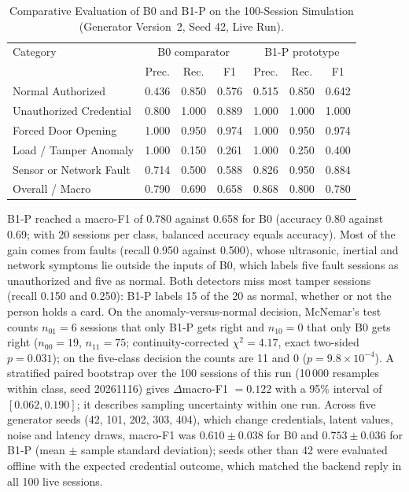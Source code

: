 \documentclass[journal,onecolumn]{IEEEtran}
\begin{document}
\begin{table}[!htbp]
\renewcommand{\arraystretch}{1.02}
\centering
\small
\caption{Comparative Evaluation of B0 and B1-P on the 100-Session Simulation (Generator Version~2, Seed 42, Live Run).}
\label{tab:b0_vs_b1}
\vspace{2pt}
\begin{tabular}{l ccc ccc}
\hline
Category & \multicolumn{3}{c}{B0 comparator} & \multicolumn{3}{c}{B1-P prototype} \\
 & Prec. & Rec. & F1 & Prec. & Rec. & F1 \\
\hline
\rule{0pt}{2.6ex}Normal Authorized & 0.436 & 0.850 & 0.576 & 0.515 & 0.850 & 0.642 \\
Unauthorized Credential & 0.800 & 1.000 & 0.889 & 1.000 & 1.000 & 1.000 \\
Forced Door Opening & 1.000 & 0.950 & 0.974 & 1.000 & 0.950 & 0.974 \\
Load / Tamper Anomaly & 1.000 & 0.150 & 0.261 & 1.000 & 0.250 & 0.400 \\
Sensor or Network Fault & 0.714 & 0.500 & 0.588 & 0.826 & 0.950 & 0.884 \\
\hline
\rule{0pt}{2.6ex}Overall / Macro & 0.790 & 0.690 & 0.658 & 0.868 & 0.800 & 0.780 \\
\hline
\end{tabular}
\end{table}

B1-P reached a macro-F1 of 0.780 against 0.658 for B0 (accuracy 0.80 against 0.69; with 20 sessions per class,
balanced accuracy equals accuracy). Most of the gain comes from faults (recall 0.950 against 0.500), whose ultrasonic,
inertial and network symptoms lie outside the inputs of B0, which labels five fault sessions as unauthorized and five
as normal. Both detectors miss most tamper sessions (recall 0.150 and 0.250): B1-P labels 15 of the 20
as normal, whether or not the person holds a card. On the anomaly-versus-normal decision, McNemar's test counts
$n_{01}=6$ sessions that only B1-P gets right and $n_{10}=0$ that only B0 gets right ($n_{00}=19$, $n_{11}=75$;
continuity-corrected $\chi^2=4.17$, exact two-sided $p=0.031$); on the five-class decision the counts are 11 and 0
($p=9.8\times10^{-4}$). A stratified paired bootstrap over the 100 sessions of this run (10\,000 resamples within
class, seed 20261116) gives $\Delta$macro-F1 $=0.122$ with a 95\% interval of $[0.062, 0.190]$; it describes sampling
uncertainty within one run. Across five generator seeds (42, 101, 202, 303, 404), which change credentials, latent
values, noise and latency draws, macro-F1 was $0.610\pm0.038$ for B0 and $0.753\pm0.036$ for B1-P (mean $\pm$ sample
standard deviation); seeds other than 42 were evaluated offline with the expected credential outcome, which matched
the backend reply in all 100 live sessions.
\end{document}

